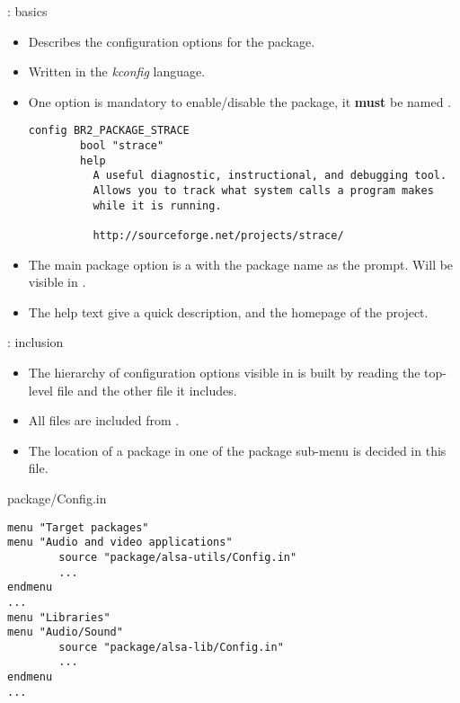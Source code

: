 \begin{frame}[fragile]{: basics}
  \begin{itemize}
  \item Describes the configuration options for the package.
  \item Written in the {\em kconfig} language.
  \item One option is mandatory to enable/disable the package, it {\bf
      must} be named .
    \begin{block}{}
      \scriptsize
\begin{verbatim}
config BR2_PACKAGE_STRACE
        bool "strace"
        help
          A useful diagnostic, instructional, and debugging tool.
          Allows you to track what system calls a program makes
          while it is running.

          http://sourceforge.net/projects/strace/
\end{verbatim}
    \end{block}
  \item The main package option is a  with the package name
    as the prompt. Will be visible in .
  \item The help text give a quick description, and the homepage of
    the project.
  \end{itemize}
\end{frame}

\begin{frame}[fragile]{: inclusion}
  \begin{itemize}
  \item The hierarchy of configuration options visible in
     is built by reading the top-level
     file and the other  file it
    includes.
  \item All  files are included from
    .
  \item The location of a package in one of the package sub-menu is
    decided in this file.
  \end{itemize}
  \begin{block}{package/Config.in}
    \tiny
\begin{verbatim}
menu "Target packages"
menu "Audio and video applications"
        source "package/alsa-utils/Config.in"
        ...
endmenu
...
menu "Libraries"
menu "Audio/Sound"
        source "package/alsa-lib/Config.in"
        ...
endmenu
...
\end{verbatim}
  \end{block}
\end{frame}

